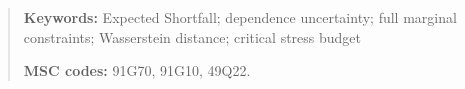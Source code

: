 \documentclass[11pt,a4paper]{article}
\theoremstyle{nonumberplain}
\theoremstyle{plain}
\begin{document}
\begin{quote}\small
\noindent\textbf{Keywords:} Expected Shortfall; dependence uncertainty; full marginal constraints; Wasserstein distance; critical stress budget

\smallskip\noindent\textbf{MSC codes:} 91G70, 91G10, 49Q22.
\end{quote}
\newpage
\tableofcontents
\clearpage

















\end{document}
